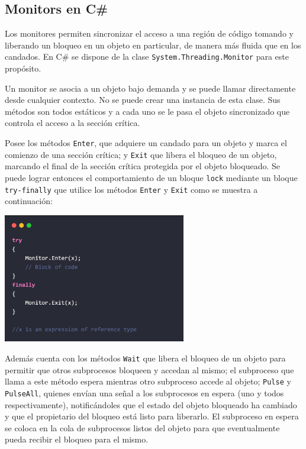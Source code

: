 \documentclass[10pt]{article} %
\newcommand{\csl}[1]{\colorbox{backcolour}{\texttt{#1}}}
\begin{document}
\subsection{Monitors en C\#}

Los monitores permiten sincronizar el acceso a una región de código tomando y liberando un bloqueo en un objeto en particular, de manera m\'as fluida que en los candados. En C\# se dispone de la clase \csl{System.Threading.Monitor} para este prop\'osito.

Un monitor se asocia a un objeto bajo demanda y se puede llamar directamente desde cualquier contexto. No se puede crear una instancia de esta clase. Sus métodos son todos estáticos y a cada uno se le pasa el objeto sincronizado que controla el acceso a la sección crítica.

Posee los m\'etodos \csl{Enter}, que adquiere un candado para un objeto y marca el comienzo de una sección crítica; y \csl{Exit}
que libera el bloqueo de un objeto, marcando el final de la sección crítica protegida por el objeto bloqueado. Se puede lograr entonces el comportamiento de un bloque \csl{lock} mediante un bloque \csl{try-finally} que utilice los m\'etodos \csl{Enter} y \csl{Exit} como se muestra a continuaci\'on:

\begin{center}
	\includegraphics[width=8cm]{monitor.jpg}
\end{center}

Adem\'as cuenta con los m\'etodos \csl{Wait} que libera el bloqueo de un objeto para permitir que otros subprocesos bloqueen y accedan al mismo; el subproceso que llama a este m\'etodo espera mientras otro subproceso accede al objeto; \csl{Pulse} y \csl{PulseAll}, quienes env\'ian una señal a los subprocesos en espera (uno y todos respectivamente), notific\'andoles que el estado del objeto bloqueado ha cambiado y que el propietario del bloqueo está listo para liberarlo. El subproceso en espera se coloca en la cola de subprocesos listos del objeto para que eventualmente pueda recibir el bloqueo para el mismo. 
\end{document}
